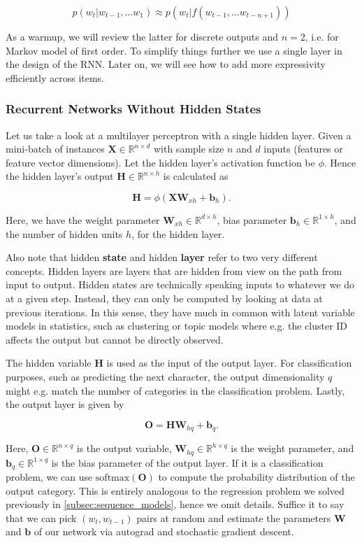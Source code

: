 $$p(w_t|w_{t-1}, \ldots w_1) \approx p(w_t|f(w_{t-1}, \ldots w_{t-n+1}))$$

As a warmup, we will review the latter for discrete outputs and $n=2$, i.e. for Markov model of first order. To simplify things further we use a single layer in the design of the RNN. Later on, we will see how to add more expressivity efficiently across items.

\subsubsection{Recurrent Networks Without Hidden States}

Let us take a look at a multilayer perceptron with a single hidden layer. Given a mini-batch of instances $\mathbf{X} \in \mathbb{R}^{n \times d}$ with sample size $n$ and $d$ inputs (features or feature vector dimensions). Let the hidden layer's activation function be $\phi$. Hence the hidden layer's output $\mathbf{H} \in \mathbb{R}^{n \times h}$ is calculated as

$$\mathbf{H} = \phi(\mathbf{X} \mathbf{W}_{xh} + \mathbf{b}_h).$$

Here, we have the weight parameter $\mathbf{W}_{xh} \in \mathbb{R}^{d \times h}$, bias parameter $\mathbf{b}_h \in \mathbb{R}^{1 \times h}$, and the number of hidden units $h$, for the hidden layer. 

Also note that hidden \textbf{state} and hidden \textbf{layer} refer to two very different concepts. Hidden layers are layers that are hidden from view on the path from input to output. Hidden states are technically speaking inputs to whatever we do at a given step. Instead, they can only be computed by looking at data at previous iterations. In this sense, they have much in common with latent variable models in statistics, such as clustering or topic models where e.g. the cluster ID affects the output but cannot be directly observed.

The hidden variable $\mathbf{H}$ is used as the input of the output layer. For classification purposes, such as predicting the next character, the output dimensionality $q$ might e.g. match the number of categories in the classification problem. Lastly, the output layer is given by

$$\mathbf{O} = \mathbf{H} \mathbf{W}_{hq} + \mathbf{b}_q.$$

Here, $\mathbf{O} \in \mathbb{R}^{n \times q}$ is the output variable, $\mathbf{W}_{hq} \in \mathbb{R}^{h \times q}$ is the weight parameter, and $\mathbf{b}_q \in \mathbb{R}^{1 \times q}$ is the bias parameter of the output layer.  If it is a classification problem, we can use $\text{softmax}(\mathbf{O})$ to compute the probability distribution of the output category. This is entirely analogous to the regression problem we solved previously in \cref{subsec:sequence_models}, hence we omit details. Suffice it to say that we can pick $(w_t, w_{t-1})$ pairs at random and estimate the parameters $\mathbf{W}$ and $\mathbf{b}$ of our network via autograd and stochastic gradient descent.

